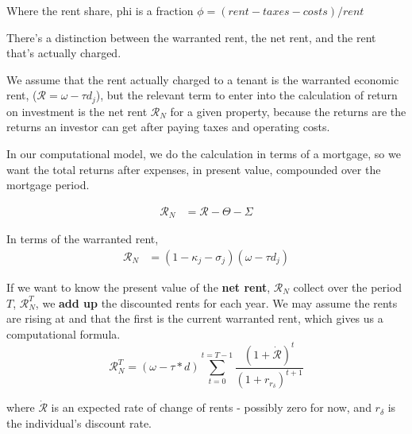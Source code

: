 Where the \gls{rent share}, phi is a fraction
$\phi = (rent-taxes-costs) /rent$ 

There's a distinction between the warranted rent, the net rent, and the rent that's actually charged.

We assume that the  rent  actually charged to a tenant is the warranted economic rent, ($\mathcal{R}= \omega - \tau d_j$), but the relevant term to enter into the calculation of return on investment is the net rent $\mathcal{R}_N$ for a given property, because the returns are the returns an investor can get after paying taxes and operating costs.

In our computational model, we do the calculation in terms of a mortgage, so we want the total returns after expenses, in present value, compounded over the mortgage  period.

\begin{align}
\mathcal{R}_N &= \mathcal{R} - \Theta - \Sigma 
\end{align}

In terms of the warranted rent, 
\begin{align}
\mathcal{R}_N &= (1-\kappa_j - \sigma_j)(\omega - \tau d_j)
\end{align}



If we want to know the  present value  of the \textbf{net rent}, $\mathcal{R}_N$  collect over the period  $T$, $\mathcal{R}_N^T$, we \textbf{add up} the discounted rents for each year. We may assume the rents are rising at and that the first is the current warranted rent, which gives us a computational formula. 
\[\mathcal{R}_N^T= (\omega-\tau*d)\sum_{t=0}^{t=T-1} \frac{(1+\dot{\mathcal{R}})^{t}} {(1+r_{r_\delta})^{t+1}} \]

\noindent where $\dot{\mathcal{R}}$ is an expected rate of change of rents - possibly zero for now, and $r_\delta$ is the individual's discount rate. 

